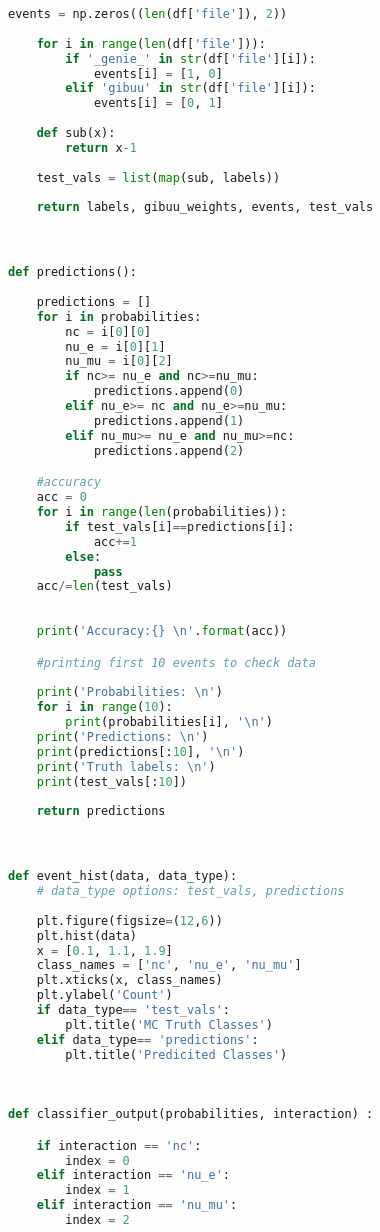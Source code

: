 \begin{lstlisting}[language=Python]
    events = np.zeros((len(df['file']), 2))
    
    for i in range(len(df['file'])):
        if '_genie_' in str(df['file'][i]):
            events[i] = [1, 0]
        elif 'gibuu' in str(df['file'][i]):
            events[i] = [0, 1]
            
    def sub(x):
        return x-1
    
    test_vals = list(map(sub, labels))   
    
    return labels, gibuu_weights, events, test_vals



def predictions():
    
    predictions = []
    for i in probabilities:
        nc = i[0][0]
        nu_e = i[0][1]
        nu_mu = i[0][2]
        if nc>= nu_e and nc>=nu_mu:
            predictions.append(0)
        elif nu_e>= nc and nu_e>=nu_mu:
            predictions.append(1)
        elif nu_mu>= nu_e and nu_mu>=nc:
            predictions.append(2)

    #accuracy
    acc = 0
    for i in range(len(probabilities)):
        if test_vals[i]==predictions[i]:
            acc+=1
        else:
            pass
    acc/=len(test_vals)
    
    
    print('Accuracy:{} \n'.format(acc))

    #printing first 10 events to check data
    
    print('Probabilities: \n')
    for i in range(10):
        print(probabilities[i], '\n')
    print('Predictions: \n')
    print(predictions[:10], '\n')
    print('Truth labels: \n')
    print(test_vals[:10])
    
    return predictions



def event_hist(data, data_type):
    # data_type options: test_vals, predictions
    
    plt.figure(figsize=(12,6))
    plt.hist(data)
    x = [0.1, 1.1, 1.9]
    class_names = ['nc', 'nu_e', 'nu_mu']
    plt.xticks(x, class_names)
    plt.ylabel('Count')
    if data_type== 'test_vals':
        plt.title('MC Truth Classes')
    elif data_type== 'predictions':
        plt.title('Predicited Classes')
    
    
        
def classifier_output(probabilities, interaction) :      

    if interaction == 'nc':
        index = 0
    elif interaction == 'nu_e':
        index = 1
    elif interaction == 'nu_mu':
        index = 2
        

\end{lstlisting}
